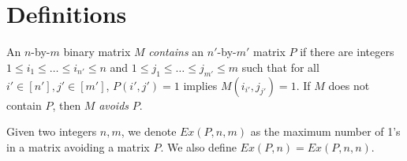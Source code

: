 \chapter{Definitions}
\label{chap:defs}

%
\begin{definition}
  \label{def:containment}
  \uses{}
An $n$-by-$m$ binary matrix $M$ \textit{contains} an $n'$-by-$m'$ matrix $P$ if
there are integers $1 \leq i_1 \leq \ldots \leq i_{n'} \leq n$ and $1 \leq j_1 \leq \ldots \leq j_{m'} \leq m$ such that
for all $i' \in [n'], j' \in [m']$, $P(i',j') = 1$ implies $M(i_{i'},j_{j'}) = 1$. If $M$ does not contain $P$, then $M$ \textit{avoids} $P$.
\end{definition}

\begin{definition}
  \label{def:extremal function}
  \uses{}
Given two integers $n,m$, we denote $Ex(P,n,m)$ as the maximum number of 1's in a matrix avoiding a matrix $P$.
We also define $Ex(P,n) = Ex(P,n,n)$.
\end{definition}
